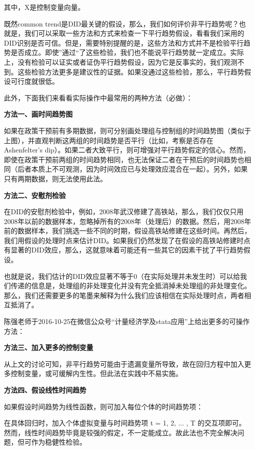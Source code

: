 \documentclass[cn,12pt,math=newtx,citestyle=gb7714-2015,bibstyle=gb7714-2015]{elegantbook}
\begin{document}
	其中，X是控制变量向量。
	
	既然common trend是DID最关键的假设，那么，我们如何评价非平行趋势呢？也就是，我们可以采取一些方法和方式来检查一下平行趋势假设，看看我们采用的DID识别是否可信。但是，需要特别提醒的是，这些方法和方式并不是检验平行趋势是否成立。即使”通过“了这些检验，我们也不能说平行趋势就一定成立。实际上，没有检验可以证实或者证伪平行趋势假设，因为它是反事实的，我们观测不到。这些检验方法更多是建议性的证据。如果没通过这些检验，那么，平行趋势假设可行度就很低。
	
	此外，下面我们来看看实际操作中最常用的两种方法（必做）：
	
	\textbf{方法一、画时间趋势图}
	
	如果在政策干预前有多期数据，则可分别画处理组与控制组的时间趋势图（类似于上图），并直观判断这两组的时间趋势是否平行（比如，考察是否存在Ashenfelter's dip）。如果二者大致平行，则可增强对平行趋势假定的信心。然而，即使在政策干预前两组的时间趋势相同，也无法保证二者在干预后的时间趋势也相同（后者本质上不可观测，因为时间效应已与处理效应混合在一起）。另外，如果只有两期数据，则无法使用此法。
	
	\textbf{方法二、安慰剂检验}
	
	在DID的安慰剂检验中，例如，2008年武汉修建了高铁站，那么，我们仅仅只用2008年以前的数据样本，忽略掉所有的2008年（处理后）的数据。然后，用2008年前的数据样本，我们挑选一些不同的时期，假设高铁站修建在这些时间。再然后，我们用假设的处理时点来估计DID。如果我们仍然发现了在假设的高铁站修建时点有显著的DID效应，那么，这就意味着可能还有一些其它的因素干扰了平行趋势假设。
	
	也就是说，我们估计的DID效应显著不等于0（在实际处理并未发生时）可以给我们传递的信息是，处理组的非处理变化并没有完全抵消掉未处理组的非处理变化。那么，我们还需要更多的笔墨来解释为什么我们应该相信在实际处理时点，两者相互抵消了。
	
	陈强老师于2016-10-25在微信公众号“计量经济学及stata应用”上给出更多的可操作方法：
	
	\textbf{方法三、加入更多的控制变量}
	
	从上文的讨论可知，非平行趋势可能由于遗漏变量所导致，故在回归方程中加入更多控制变量，或可缓解内生性。但此法在实践中不易实施。
	
	\textbf{方法四、假设线性时间趋势}
	
	如果假设时间趋势为线性函数，则可加入每位个体的时间趋势项：
	
	在具体回归时，加入个体虚拟变量与时间趋势项 t = 1, 2, ... , T 的交互项即可。然而，线性时间趋势毕竟是较强的假定，不一定能成立。故此法也不完全解决问题，但可作为稳健性检验。
	
\end{document}
